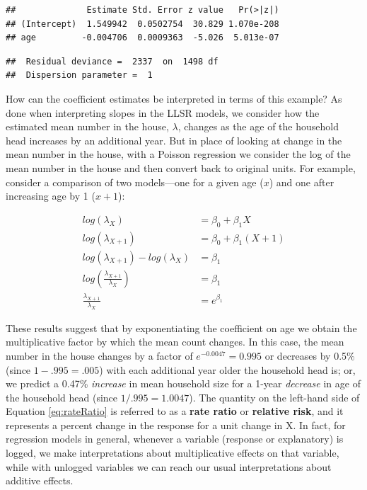\documentclass[
]{krantz}
\begin{document}
\begin{verbatim}
##              Estimate Std. Error z value   Pr(>|z|)
## (Intercept)  1.549942  0.0502754  30.829 1.070e-208
## age         -0.004706  0.0009363  -5.026  5.013e-07
\end{verbatim}

\begin{verbatim}
##  Residual deviance =  2337  on  1498 df 
##  Dispersion parameter =  1
\end{verbatim}

How can the coefficient estimates be interpreted in terms of this example? As done when interpreting slopes in the LLSR models, we consider how the estimated mean number in the house, \(\lambda\), changes as the age of the household head increases by an additional year. But in place of looking at change in the mean number in the house, with a Poisson regression we consider the log of the mean number in the house and then convert back to original units. For example, consider a comparison of two models---one for a given age (\(x\)) and one after increasing age by 1 (\(x+1\)):

\begin{equation}
\begin{split}
log(\lambda_X) &= \beta_0 + \beta_1X \\
log(\lambda_{X+1}) &= \beta_0 + \beta_1(X+1) \\
log(\lambda_{X+1})-log(\lambda_X) &=  \beta_1 \\
log \left(\frac{\lambda_{X+1}}{\lambda_X}\right)   &= \beta_1\\
\frac{\lambda_{X+1}}{\lambda_X} &= e^{\beta_1}
\end{split}
\label{eq:rateRatio}
\end{equation}

These results suggest that by exponentiating the coefficient on age we obtain the multiplicative factor by which the mean count changes. In this case, the mean number in the house changes by a factor of \(e^{-0.0047}=0.995\) or decreases by 0.5\% (since \(1-.995 = .005\)) with each additional year older the household head is; or, we predict a 0.47\% \emph{increase} in mean household size for a 1-year \emph{decrease} in age of the household head (since \(1/.995=1.0047\)). The quantity on the left-hand side of Equation \eqref{eq:rateRatio} is referred to as a \textbf{rate ratio} or \textbf{relative risk},  and it represents a percent change in the response for a unit change in X. In fact, for regression models in general, whenever a variable (response or explanatory) is logged, we make interpretations about multiplicative effects on that variable, while with unlogged variables we can reach our usual interpretations about additive effects.
\end{document}
